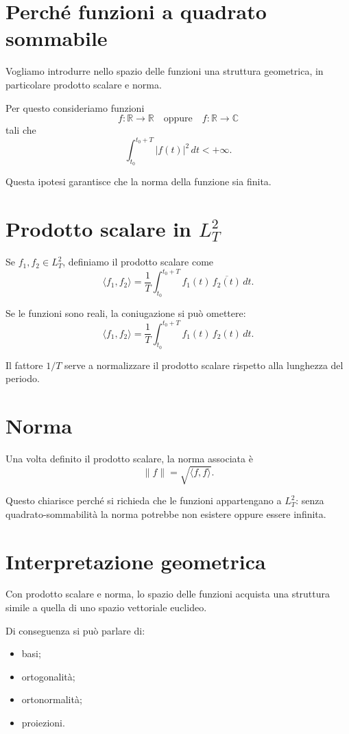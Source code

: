 \section{Perché funzioni a quadrato sommabile}

Vogliamo introdurre nello spazio delle funzioni una struttura geometrica,
in particolare prodotto scalare e norma.

Per questo consideriamo funzioni
\[
f:\mathbb{R}\to\mathbb{R}
\quad \text{oppure} \quad
f:\mathbb{R}\to\mathbb{C}
\]
tali che
\[
\int_{t_0}^{t_0+T} |f(t)|^2\,dt < +\infty.
\]

Questa ipotesi garantisce che la norma della funzione sia finita.

\section{Prodotto scalare in \(L_T^2\)}

Se \(f_1,f_2\in L_T^2\), definiamo il prodotto scalare come
\[
\langle f_1,f_2\rangle
=
\frac{1}{T}\int_{t_0}^{t_0+T} f_1(t)\,\overline{f_2(t)}\,dt.
\]

Se le funzioni sono reali, la coniugazione si può omettere:
\[
\langle f_1,f_2\rangle
=
\frac{1}{T}\int_{t_0}^{t_0+T} f_1(t)\,f_2(t)\,dt.
\]

Il fattore \(1/T\) serve a normalizzare il prodotto scalare rispetto alla lunghezza del periodo.

\section{Norma}

Una volta definito il prodotto scalare, la norma associata è
\[
\|f\|=\sqrt{\langle f,f\rangle}.
\]

Questo chiarisce perché si richieda che le funzioni appartengano a \(L_T^2\):
senza quadrato-sommabilità la norma potrebbe non esistere oppure essere infinita.

\section{Interpretazione geometrica}

Con prodotto scalare e norma, lo spazio delle funzioni acquista una struttura
simile a quella di uno spazio vettoriale euclideo.

Di conseguenza si può parlare di:
\begin{itemize}
    \item basi;
    \item ortogonalità;
    \item ortonormalità;
    \item proiezioni.
\end{itemize}

